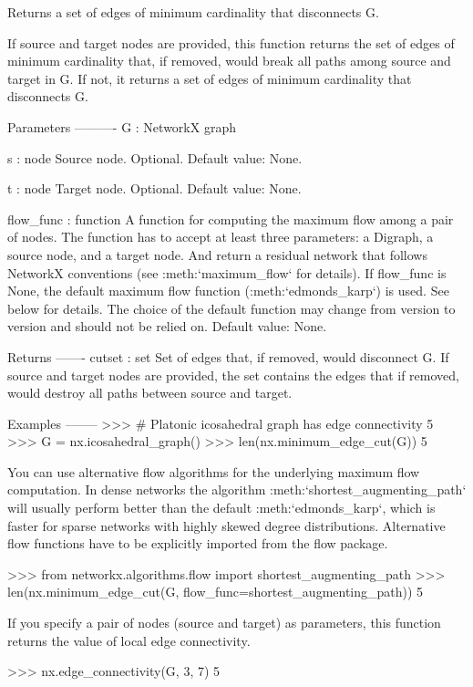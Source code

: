 \begin{DoxyVerb}Returns a set of edges of minimum cardinality that disconnects G.

If source and target nodes are provided, this function returns the
set of edges of minimum cardinality that, if removed, would break
all paths among source and target in G. If not, it returns a set of
edges of minimum cardinality that disconnects G.

Parameters
----------
G : NetworkX graph

s : node
    Source node. Optional. Default value: None.

t : node
    Target node. Optional. Default value: None.

flow_func : function
    A function for computing the maximum flow among a pair of nodes.
    The function has to accept at least three parameters: a Digraph,
    a source node, and a target node. And return a residual network
    that follows NetworkX conventions (see :meth:`maximum_flow` for
    details). If flow_func is None, the default maximum flow function
    (:meth:`edmonds_karp`) is used. See below for details. The
    choice of the default function may change from version
    to version and should not be relied on. Default value: None.

Returns
-------
cutset : set
    Set of edges that, if removed, would disconnect G. If source
    and target nodes are provided, the set contains the edges that
    if removed, would destroy all paths between source and target.

Examples
--------
>>> # Platonic icosahedral graph has edge connectivity 5
>>> G = nx.icosahedral_graph()
>>> len(nx.minimum_edge_cut(G))
5

You can use alternative flow algorithms for the underlying
maximum flow computation. In dense networks the algorithm
:meth:`shortest_augmenting_path` will usually perform better
than the default :meth:`edmonds_karp`, which is faster for
sparse networks with highly skewed degree distributions.
Alternative flow functions have to be explicitly imported
from the flow package.

>>> from networkx.algorithms.flow import shortest_augmenting_path
>>> len(nx.minimum_edge_cut(G, flow_func=shortest_augmenting_path))
5

If you specify a pair of nodes (source and target) as parameters,
this function returns the value of local edge connectivity.

>>> nx.edge_connectivity(G, 3, 7)
5


\end{DoxyVerb}

